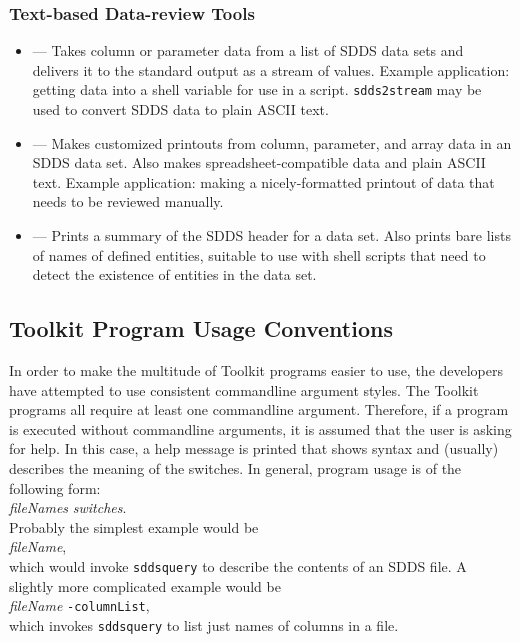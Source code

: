 \documentclass[11pt]{article}
\begin{document}
\subsubsection{Text-based Data-review Tools}

\begin{itemize}
\item {} --- Takes column or parameter data from a list of SDDS data sets and delivers it to
the standard output as a stream of values.  Example application: getting data into a shell variable for use in a
script.  \verb|sdds2stream| may be used to convert SDDS data to plain ASCII text.

\item {} --- Makes customized printouts from
column, parameter, and array data in an SDDS data set.  Also makes
spreadsheet-compatible data and plain ASCII text.  Example
application: making a nicely-formatted printout of data that needs to
be reviewed manually.

\item {} --- Prints a summary of the SDDS header for a data set.  Also prints bare lists of names
of defined entities, suitable to use with shell scripts that need to detect the existence of entities in the data
set.

\end{itemize}


\subsection{Toolkit Program Usage Conventions}

In order to make the multitude of Toolkit programs easier to use, the developers have attempted to use consistent
commandline argument styles.  The Toolkit programs all require at least one commandline argument.  Therefore, if a
program is executed without commandline arguments, it is assumed that the user is asking for help.  In this case, a
help message is printed that shows syntax and (usually) describes the meaning of the switches.  In general, program
usage is of the following form:\\
\hspace*{5mm}{\tt programName} {\em fileNames} {\em switches}.\\
Probably the simplest example would be \\ 
\hspace*{5mm}{\tt sddsquery } {\em fileName},\\
which would invoke {\tt sddsquery} to describe the contents of an SDDS file.
A slightly more complicated example would be\\
\hspace*{5mm}{\tt sddsquery } {\em fileName} {\tt -columnList},\\
which invokes {\tt sddsquery} to list just names of columns in a file.
\end{document}
